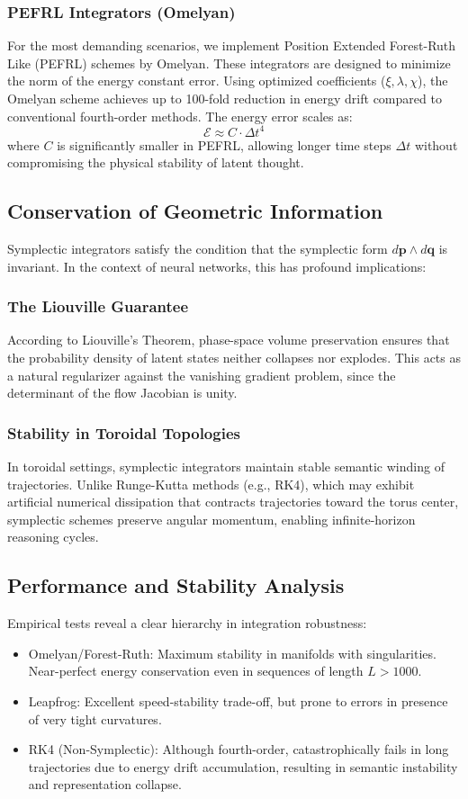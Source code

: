 \documentclass{article}
\numberwithin{equation}{section}
\begin{document}
\subsubsection{PEFRL Integrators (Omelyan)}
For the most demanding scenarios, we implement Position Extended Forest-Ruth Like (PEFRL) schemes by Omelyan. These integrators are designed to minimize the norm of the energy constant error. Using optimized coefficients ($\xi, \lambda, \chi$), the Omelyan scheme achieves up to 100-fold reduction in energy drift compared to conventional fourth-order methods.
The energy error scales as:
\[
\mathcal{E} \approx C \cdot \Delta t^4
\]
where $C$ is significantly smaller in PEFRL, allowing longer time steps $\Delta t$ without compromising the physical stability of latent thought.

\subsection{Conservation of Geometric Information}
Symplectic integrators satisfy the condition that the symplectic form $d\mathbf{p} \wedge d\mathbf{q}$ is invariant. In the context of neural networks, this has profound implications:

\subsubsection{The Liouville Guarantee}
According to Liouville's Theorem, phase-space volume preservation ensures that the probability density of latent states neither collapses nor explodes. This acts as a natural regularizer against the vanishing gradient problem, since the determinant of the flow Jacobian is unity.

\subsubsection{Stability in Toroidal Topologies}
In toroidal settings, symplectic integrators maintain stable semantic winding of trajectories. Unlike Runge-Kutta methods (e.g., RK4), which may exhibit artificial numerical dissipation that contracts trajectories toward the torus center, symplectic schemes preserve angular momentum, enabling infinite-horizon reasoning cycles.

\subsection{Performance and Stability Analysis}
Empirical tests reveal a clear hierarchy in integration robustness:
\begin{itemize}
\item Omelyan/Forest-Ruth: Maximum stability in manifolds with singularities. Near-perfect energy conservation even in sequences of length $L > 1000$.
\item Leapfrog: Excellent speed-stability trade-off, but prone to errors in presence of very tight curvatures.
\item RK4 (Non-Symplectic): Although fourth-order, catastrophically fails in long trajectories due to energy drift accumulation, resulting in semantic instability and representation collapse.
\end{itemize}
\end{document}
